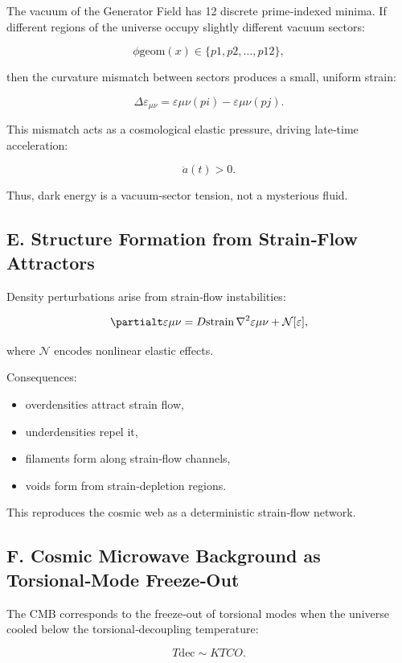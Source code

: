 \documentclass[reprint,amsmath,amssymb,aps,prl,floatfix]{revtex4-2}
\begin{document}
\begin{itemize}
The vacuum of the Generator Field has 12 discrete prime‑indexed minima.  
If different regions of the universe occupy slightly different vacuum sectors:

\[
\phi{\mathrm{geom}}(x) \in \{p1, p2, \dots, p{12}\},
\]

then the curvature mismatch between sectors produces a small, uniform strain:

\[
\Delta \varepsilon_{\mu\nu}
=
\varepsilon{\mu\nu}(pi) - \varepsilon{\mu\nu}(pj).
\]

This mismatch acts as a cosmological elastic pressure, driving late‑time acceleration:

\[
\ddot{a}(t) > 0.
\]

Thus, dark energy is a vacuum‑sector tension, not a mysterious fluid.

\subsection{E. Structure Formation from Strain‑Flow Attractors}

Density perturbations arise from strain‑flow instabilities:

\[
\partialt \varepsilon{\mu\nu}
=
D{\mathrm{strain}}\,\nabla^2 \varepsilon{\mu\nu}
+
\mathcal{N}[\varepsilon],
\]

where \(\mathcal{N}\) encodes nonlinear elastic effects.

Consequences:

\begin{itemize}
\item overdensities attract strain flow,  
\item underdensities repel it,  
\item filaments form along strain‑flow channels,  
\item voids form from strain‑depletion regions.
\end{itemize}

This reproduces the cosmic web as a deterministic strain‑flow network.

\subsection{F. Cosmic Microwave Background as Torsional‑Mode Freeze‑Out}

The CMB corresponds to the freeze‑out of torsional modes when the universe cooled below the torsional‑decoupling temperature:

\[
T{\mathrm{dec}} \sim K{TCO}.
\]


\end{itemize}
\end{document}

